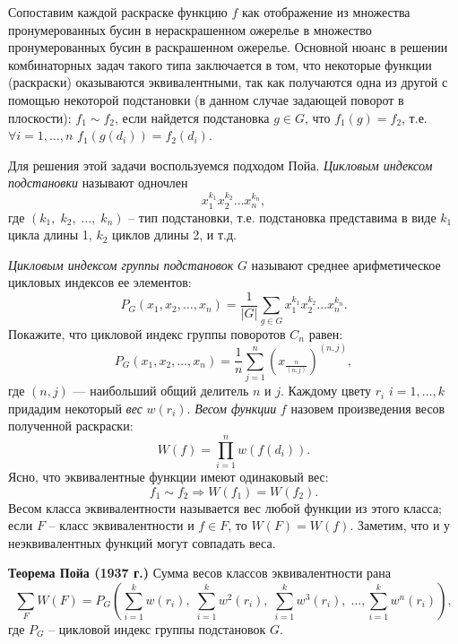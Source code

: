 \begin{ordre}

Сопоставим каждой раскраске функцию $f$ как отображение из множества пронумерованных бусин в нераскрашенном ожерелье в множество пронумерованных бусин в раскрашенном ожерелье. Основной нюанс в решении комбинаторных задач такого типа заключается в том, что некоторые функции (раскраски) оказываются эквивалентными, так как получаются одна из другой с помощью некоторой подстановки (в данном случае задающей поворот в плоскости): $f_{1} \sim f_{2} $, если найдется подстановка $g\in G$, что $f_{1} (g)=f_{2} $, т.е. $\forall i=1,\ldots ,n$   $f_{1} \left(g\left(d_{i} \right)\right)=f_{2} \left(d_{i} \right).$

Для решения этой задачи воспользуемся подходом Пойа.
\textit{Цикловым индексом подстановки} называют одночлен
\[x_{1} ^{k_{1} } x_{2} ^{k_{2} } \ldots x_{n} ^{k_{n} } ,\] 
где $\left(k_{1} ,\; k_{2} ,\; \ldots ,\; k_{n} \right)$ -- тип подстановки, т.е. подстановка представима в виде $k_{1} $ цикла длины 1, $k_{2} $ циклов длины 2,  и т.д.

\textit{Цикловым индексом группы подстановок} $G$ называют среднее арифметическое цикловых индексов ее элементов:
\[P_{G} (x_{1} ,x_{2} ,\ldots ,x_{n} )=\frac{1}{|G|} \sum _{g\in G}x_{1} ^{k_{1} } x_{2} ^{k_{2} } \ldots x_{n} ^{k_{n} }  .\] 
Покажите, что цикловой индекс группы поворотов $C_n$ равен: $$P_{G} (x_{1} ,x_{2} ,\ldots ,x_{n} )=\frac{1}{n} \sum _{j=1}^{n}\left(x_{\frac{n}{(n,j)} } \right)^{(n,j)}  ,$$ где $(n,j)$ --- наибольший общий делитель $n$ и $j$. Каждому цвету $r_{i} $ $i=1,\ldots ,k$ придадим некоторый \textit{вес} $w(r_{i} )$. \textit{Весом функции} $f$ назовем произведения весов полученной раскраски:
\[W(f)=\prod _{i=1}^{n}w(f(d_{i} )).\] 
Ясно, что эквивалентные функции имеют одинаковый вес:
\[f_{1} \sim f_{2} \Rightarrow W\left(f_{1} \right)=W\left(f_{2} \right).\] 
Весом класса эквивалентности называется вес любой функции из этого класса; если $F$ -- класс эквивалентности и $f\in F$, то $W(F)=W(f)$. Заметим, что и у неэквивалентных функций могут совпадать веса.

\textbf{Теорема Пойа (1937 г.)}
Сумма весов классов эквивалентности рана
$$\sum _{F}W(F) =P_{G} \left(\sum _{i=1}^{k}w(r_{i} ) ,\; \sum _{i=1}^{k}w^{2} (r_{i} ) ,\; \sum _{i=1}^{k}w^{3} (r_{i} ) ,\; \ldots ,\sum _{i=1}^{k}w^{n} (r_{i} ) \right),$$ где $P_{G} $ -- цикловой индекс группы подстановок $G$.

\end{ordre}

